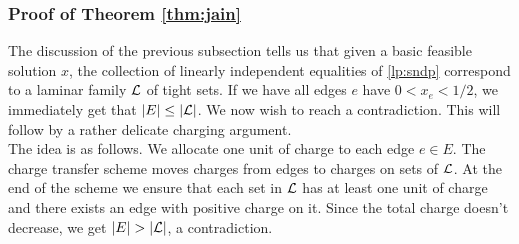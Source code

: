 \documentclass[11pt]{article}
\begin{document}
\subsubsection*{Proof of Theorem \ref{thm:jain}}
The discussion of the previous subsection tells us that given a basic feasible solution $x$, the collection of linearly independent equalities of \eqref{lp:sndp} correspond to a laminar family ${\mathcal L}$ of tight sets. If we have all edges $e$ have $0 < x_e < 1/2$, we immediately get that $|E| \le |{\mathcal L}|$. We now wish to reach a contradiction. This will follow by a rather delicate charging argument. \\

\noindent
The idea is as follows. We allocate one unit of charge to each edge $e\in E$. The charge transfer 
scheme moves charges from edges to charges on sets of ${\mathcal L}$. At the end of the scheme we ensure that each set in ${\mathcal L}$ has at least one unit of charge and there exists an edge with positive charge on it. Since the total charge doesn't decrease, we get $|E| > |{\mathcal L}|$, a contradiction. \\
\end{document}
